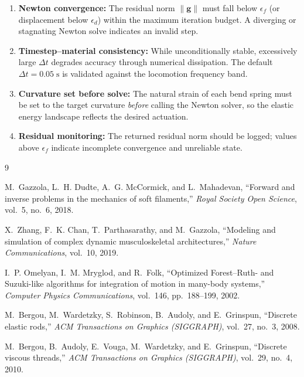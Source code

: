 \documentclass[11pt]{article}
\newcommand{\vect}[1]{\mathbf{#1}}
\begin{document}
\begin{enumerate}
  \item \textbf{Newton convergence:} The residual norm $\|\vect{g}\|$
        must fall below $\epsilon_f$ (or displacement below $\epsilon_d$)
        within the maximum iteration budget.  A diverging or stagnating
        Newton solve indicates an invalid step.

  \item \textbf{Timestep--material consistency:} While unconditionally
        stable, excessively large $\Delta t$ degrades accuracy through
        numerical dissipation.  The default $\Delta t = 0.05\;\mathrm{s}$
        is validated against the locomotion frequency band.

  \item \textbf{Curvature set before solve:} The natural strain of each
        bend spring must be set to the target curvature \emph{before}
        calling the Newton solver, so the elastic energy landscape
        reflects the desired actuation.

  \item \textbf{Residual monitoring:} The returned residual norm should
        be logged; values above $\epsilon_f$ indicate incomplete
        convergence and unreliable state.
\end{enumerate}

\begin{thebibliography}{9}

M.~Gazzola, L.~H. Dudte, A.~G. McCormick, and L.~Mahadevan,
``Forward and inverse problems in the mechanics of soft filaments,''
\textit{Royal Society Open Science}, vol.~5, no.~6, 2018.

X.~Zhang, F.~K. Chan, T.~Parthasarathy, and M.~Gazzola,
``Modeling and simulation of complex dynamic musculoskeletal
architectures,''
\textit{Nature Communications}, vol.~10, 2019.

I.~P. Omelyan, I.~M. Mryglod, and R.~Folk,
``Optimized Forest--Ruth- and Suzuki-like algorithms for integration
of motion in many-body systems,''
\textit{Computer Physics Communications}, vol.~146, pp.~188--199, 2002.

M.~Bergou, M.~Wardetzky, S.~Robinson, B.~Audoly, and E.~Grinspun,
``Discrete elastic rods,''
\textit{ACM Transactions on Graphics (SIGGRAPH)}, vol.~27, no.~3, 2008.

M.~Bergou, B.~Audoly, E.~Vouga, M.~Wardetzky, and E.~Grinspun,
``Discrete viscous threads,''
\textit{ACM Transactions on Graphics (SIGGRAPH)}, vol.~29, no.~4, 2010.

\end{thebibliography}
\end{document}
